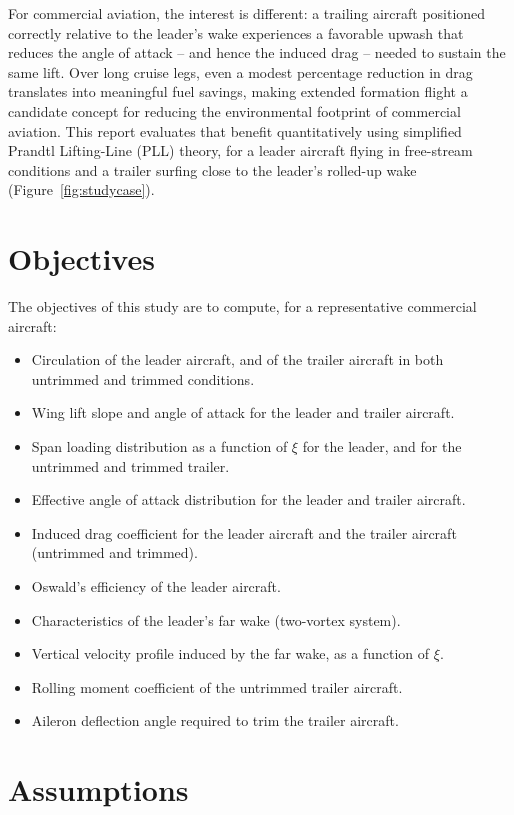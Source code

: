 \documentclass[11pt,a4paper]{article}
\begin{document}
For commercial aviation, the interest is different: a trailing aircraft positioned correctly relative to the leader's wake experiences a favorable upwash that reduces the angle of attack -- and hence the induced drag -- needed to sustain the same lift. Over long cruise legs, even a modest percentage reduction in drag translates into meaningful fuel savings, making extended formation flight a candidate concept for reducing the environmental footprint of commercial aviation. This report evaluates that benefit quantitatively using simplified Prandtl Lifting-Line (PLL) theory, for a leader aircraft flying in free-stream conditions and a trailer surfing close to the leader's rolled-up wake (Figure~\ref{fig:studycase}).

\section{Objectives}

The objectives of this study are to compute, for a representative commercial aircraft:

\begin{itemize}
\item Circulation of the leader aircraft, and of the trailer aircraft in both untrimmed and trimmed conditions.
\item Wing lift slope and angle of attack for the leader and trailer aircraft.
\item Span loading distribution as a function of $\xi$ for the leader, and for the untrimmed and trimmed trailer.
\item Effective angle of attack distribution for the leader and trailer aircraft.
\item Induced drag coefficient for the leader aircraft and the trailer aircraft (untrimmed and trimmed).
\item Oswald's efficiency of the leader aircraft.
\item Characteristics of the leader's far wake (two-vortex system).
\item Vertical velocity profile induced by the far wake, as a function of $\xi$.
\item Rolling moment coefficient of the untrimmed trailer aircraft.
\item Aileron deflection angle required to trim the trailer aircraft.
\end{itemize}

\section{Assumptions}
\end{document}
